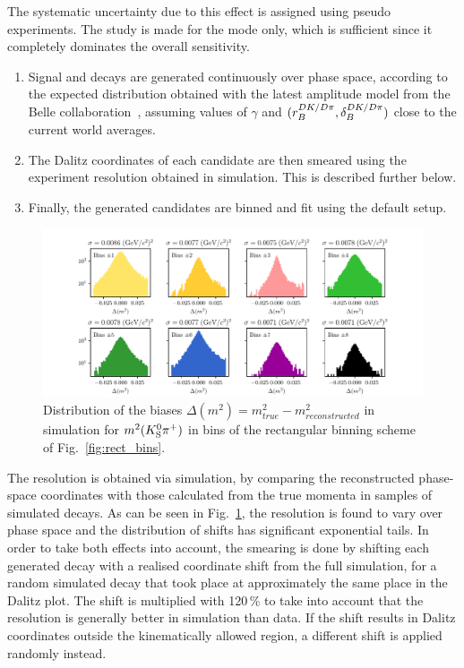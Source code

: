 The systematic uncertainty due to this effect is assigned using pseudo experiments. The study is made for the \DtoKspipi mode only, which is sufficient since it completely dominates the overall sensitivity. 
\begin{enumerate}
    \item Signal \BtoDK and \BtoDpi decays are generated continuously over phase space, according to the expected distribution obtained with the latest amplitude model from the Belle collaboration~\cite{Belle2018}, assuming values of $\gamma$ and $(r_B^{DK/{D}\pi},\delta_B^{DK/{D}\pi})$ close to the current world averages.
    \item The Dalitz coordinates of each candidate are then smeared using the experiment resolution obtained in simulation. This is described further below.
    \item Finally, the generated candidates are binned and fit using the default setup. 
\end{enumerate}
\begin{figure}[tb]
    \centering
    \includegraphics[width=\columnwidth]{figures/analysis/systematics/Dalitz_resolution_rect_bins.pdf}
    \caption{Distribution of the biases $\Delta (m^2) = m^2_{true} - m^2_{reconstructed}$ in simulation for $m^2({{K}^0_{\mathrm{S}}} {{\pi}^+})$ in bins of the rectangular binning scheme of Fig.~\ref{fig:rect_bins}.}
    \label{fig:dalitz_coord_resolution_and_correlation}
\end{figure}
The resolution is obtained via simulation, by comparing the reconstructed phase-space coordinates with those calculated from the true momenta in samples of simulated \DtoKspipi decays. As can be seen in Fig.~\ref{fig:dalitz_coord_resolution_and_correlation}, the resolution is found to vary over phase space and the distribution of shifts has significant exponential tails. In order to take both effects into account, the smearing is done by shifting each generated decay with a realised coordinate shift from the full \lhcb simulation, for a random simulated decay that took place at approximately the same place in the Dalitz plot. The shift is multiplied with 120\,\% to take into account that the resolution is generally better in simulation than data. If the shift results in Dalitz coordinates outside the kinematically allowed region, a different shift is applied randomly instead.

